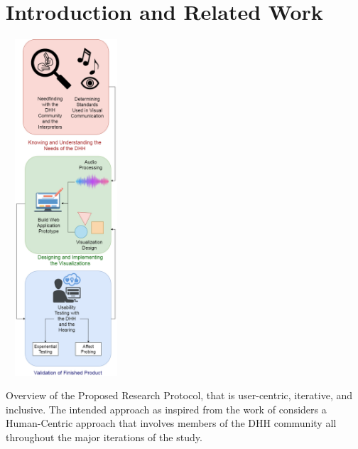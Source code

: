 \documentclass{sigchi-ext}
\begin{document}

\printccsdesc

\section{Introduction and Related Work}

\begin{marginfigure}[-2pc]
\begin{minipage}{\marginparwidth}
     \centering
    \includegraphics[width=4.5cm,height=12.5cm]{figures/newSystemDesignFlowchart.png}
    \caption{Overview of the Proposed Research Protocol, that is user-centric, iterative, and inclusive. The intended approach as inspired from the work of \protect\cite{deja2019myosl} considers a Human-Centric approach that involves members of the DHH community all throughout the major iterations of the study.}
    \label{fig:methodology}
    \end{minipage}
\end{marginfigure}
\end{document}
